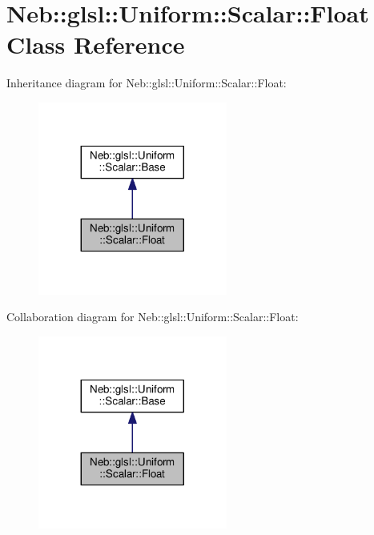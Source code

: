 \hypertarget{classNeb_1_1glsl_1_1Uniform_1_1Scalar_1_1Float}{\section{Neb\-:\-:glsl\-:\-:Uniform\-:\-:Scalar\-:\-:Float Class Reference}
\label{classNeb_1_1glsl_1_1Uniform_1_1Scalar_1_1Float}
}


Inheritance diagram for Neb\-:\-:glsl\-:\-:Uniform\-:\-:Scalar\-:\-:Float\-:
\nopagebreak
\begin{figure}[H]
\begin{center}
\leavevmode
\includegraphics[width=176pt]{classNeb_1_1glsl_1_1Uniform_1_1Scalar_1_1Float__inherit__graph}
\end{center}
\end{figure}


Collaboration diagram for Neb\-:\-:glsl\-:\-:Uniform\-:\-:Scalar\-:\-:Float\-:
\nopagebreak
\begin{figure}[H]
\begin{center}
\leavevmode
\includegraphics[width=176pt]{classNeb_1_1glsl_1_1Uniform_1_1Scalar_1_1Float__coll__graph}
\end{center}
\end{figure}
